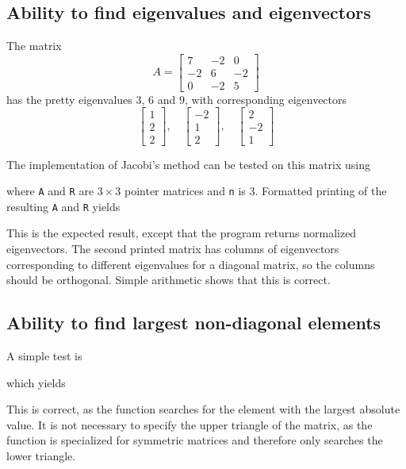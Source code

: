 \documentclass[12pt,english,a4paper]{report}
\begin{document}
\subsection{Ability to find eigenvalues and eigenvectors}
The matrix
\[
A = \begin{bmatrix}7 & -2 & 0\\ -2 & 6 & -2\\ 0 & -2 & 5\end{bmatrix}
\]
has the pretty eigenvalues \(3\), \(6\) and \(9\), with corresponding eigenvectors
\[
\begin{bmatrix}1 \\ 2 \\ 2\end{bmatrix},\quad
\begin{bmatrix}-2 \\ 1 \\ 2\end{bmatrix}, \quad
\begin{bmatrix}2 \\ -2 \\ 1\end{bmatrix}
\]

The implementation of Jacobi's method can be tested on this matrix using

where \texttt{A} and \texttt{R} are \(3\times3\) pointer matrices and \texttt{n} is \(3\). Formatted printing of the resulting \texttt{A} and \texttt{R} yields

This is the expected result, except that the program returns normalized eigenvectors. The second printed matrix has columns of eigenvectors corresponding to different eigenvalues for a diagonal matrix, so the columns should be orthogonal. Simple arithmetic shows that this is correct.
\subsection{Ability to find largest non-diagonal elements}
A simple test is

which yields

This is correct, as the function searches for the element with the largest absolute value. It is not necessary to specify the upper triangle of the matrix, as the function is specialized for symmetric matrices and therefore only searches the lower triangle.








\clearpage
{}
\printbibliography
\end{document}
